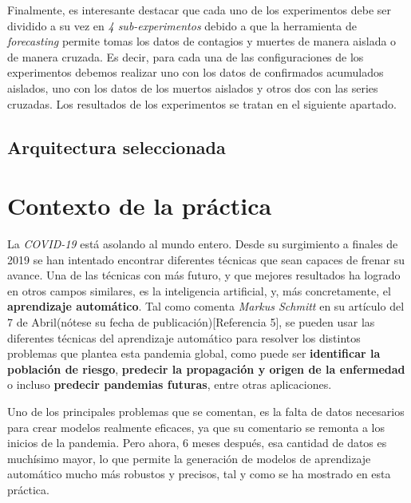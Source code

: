 \documentclass[12pt,a4paper, xcolor=table]{article}
\begin{document}
    Finalmente, es interesante destacar que cada uno de los experimentos debe ser dividido a su vez en \textit{4 sub-experimentos} debido a que la herramienta de \textit{forecasting} permite tomas los datos de contagios y muertes de manera aislada o de manera cruzada. Es decir, para cada una de las configuraciones de los experimentos debemos realizar uno con los datos de confirmados acumulados aislados, uno con los datos de los muertos aislados y otros dos con las series cruzadas. Los resultados de los experimentos se tratan en el siguiente apartado.

    \subsection{Arquitectura seleccionada}

    \newpage

    \section{Contexto de la práctica}

      La \textit{COVID-19} está asolando al mundo entero. Desde su surgimiento a finales de 2019 se han intentado encontrar diferentes técnicas que sean capaces de frenar su avance. Una de las técnicas con más futuro, y que mejores resultados ha logrado en otros campos similares, es la inteligencia artificial, y, más concretamente, el \textbf{aprendizaje automático}. Tal como comenta \textit{Markus Schmitt} en su artículo del 7 de Abril(nótese su fecha de publicación)[Referencia 5], se pueden usar las diferentes técnicas del aprendizaje automático para resolver los distintos problemas que plantea esta pandemia global, como puede ser \textbf{identificar la población de riesgo}, \textbf{predecir la propagación y origen de la enfermedad} o incluso \textbf{predecir pandemias futuras}, entre otras aplicaciones.

      \vspace{1mm}

      Uno de los principales problemas que se comentan, es la falta de datos necesarios para crear modelos realmente eficaces, ya que su comentario se remonta a los inicios de la pandemia. Pero ahora, 6 meses después, esa cantidad de datos es muchísimo mayor, lo que permite la generación de modelos de aprendizaje automático mucho más robustos y precisos, tal y como se ha mostrado en esta práctica.

      \vspace{4mm}
\end{document}
